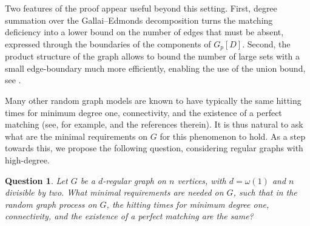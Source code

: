 \documentclass[notitlepage]{scrartcl}
\newtheorem{question}[thm]{Question}
\begin{document}
Two features of the proof appear useful beyond this setting.
First, degree summation over the Gallai--Edmonds decomposition turns the matching deficiency into a lower bound on the number of edges that must be absent, expressed through the boundaries of the components of $G_p[D]$. 
Second, the product structure of the graph allows to bound the number of large sets with a small edge-boundary much more efficiently, enabling the use of the union bound, see .


Many other random graph models are known to have typically the same hitting times for minimum degree one, connectivity, and the existence of a perfect matching (see, for example, \cite{FP04} and the references therein). It is thus natural to ask what are the minimal requirements on $G$ for this phenomenon to hold. As a step towards this, we propose the following question, considering regular graphs with high-degree.
\begin{question}
    Let $G$ be a $d$-regular graph on $n$ vertices, with $d=\omega(1)$ and $n$ divisible by two. What minimal requirements are needed on $G$, such that in the random graph process on $G$, the hitting times for minimum degree one, connectivity, and the existence of a perfect matching are the same?
\end{question}

\end{document}
